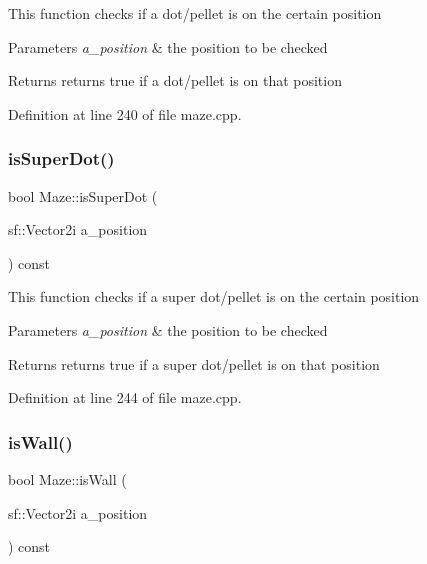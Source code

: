 This function checks if a dot/pellet is on the certain position


\begin{DoxyParams}{Parameters}
{\em a\+\_\+position} & the position to be checked \\
\hline
\end{DoxyParams}
\begin{DoxyReturn}{Returns}
returns true if a dot/pellet is on that position 
\end{DoxyReturn}


Definition at line 240 of file maze.\+cpp.

\mbox{\label{class_maze_a52450a5ef93f1d11802969587b5ee00d}} 
\subsubsection{\texorpdfstring{is\+Super\+Dot()}{isSuperDot()}}
{\footnotesize\ttfamily bool Maze\+::is\+Super\+Dot (\begin{DoxyParamCaption}\item[{sf\+::\+Vector2i}]{a\+\_\+position }\end{DoxyParamCaption}) const}

This function checks if a super dot/pellet is on the certain position


\begin{DoxyParams}{Parameters}
{\em a\+\_\+position} & the position to be checked \\
\hline
\end{DoxyParams}
\begin{DoxyReturn}{Returns}
returns true if a super dot/pellet is on that position 
\end{DoxyReturn}


Definition at line 244 of file maze.\+cpp.

\mbox{\label{class_maze_a51a92b406d8376082d6c4f8c67b1490b}} 
\subsubsection{\texorpdfstring{is\+Wall()}{isWall()}}
{\footnotesize\ttfamily bool Maze\+::is\+Wall (\begin{DoxyParamCaption}\item[{sf\+::\+Vector2i}]{a\+\_\+position }\end{DoxyParamCaption}) const}

